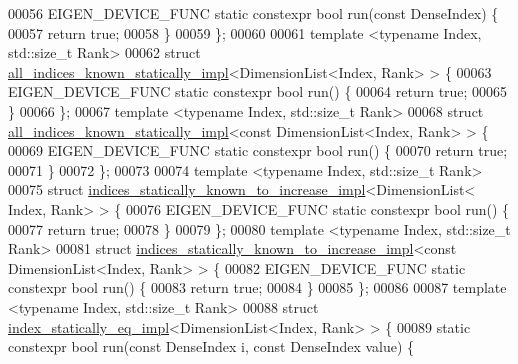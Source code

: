 \begin{DoxyCode}
00056   EIGEN\_DEVICE\_FUNC \textcolor{keyword}{static} constexpr \textcolor{keywordtype}{bool} run(\textcolor{keyword}{const} DenseIndex) \{
00057     \textcolor{keywordflow}{return} \textcolor{keyword}{true};
00058   \}
00059 \};
00060 
00061 \textcolor{keyword}{template} <\textcolor{keyword}{typename} Index, std::\textcolor{keywordtype}{size\_t} Rank>
00062 \textcolor{keyword}{struct }\hyperlink{struct_eigen_1_1internal_1_1all__indices__known__statically__impl}{all\_indices\_known\_statically\_impl}<DimensionList<Index, Rank> > \{
00063   EIGEN\_DEVICE\_FUNC \textcolor{keyword}{static} constexpr \textcolor{keywordtype}{bool} run() \{
00064     \textcolor{keywordflow}{return} \textcolor{keyword}{true};
00065   \}
00066 \};
00067 \textcolor{keyword}{template} <\textcolor{keyword}{typename} Index, std::\textcolor{keywordtype}{size\_t} Rank>
00068 \textcolor{keyword}{struct }\hyperlink{struct_eigen_1_1internal_1_1all__indices__known__statically__impl}{all\_indices\_known\_statically\_impl}<const DimensionList<Index, Rank> 
      > \{
00069   EIGEN\_DEVICE\_FUNC \textcolor{keyword}{static} constexpr \textcolor{keywordtype}{bool} run() \{
00070     \textcolor{keywordflow}{return} \textcolor{keyword}{true};
00071   \}
00072 \};
00073 
00074 \textcolor{keyword}{template} <\textcolor{keyword}{typename} Index, std::\textcolor{keywordtype}{size\_t} Rank>
00075 \textcolor{keyword}{struct }\hyperlink{struct_eigen_1_1internal_1_1indices__statically__known__to__increase__impl}{indices\_statically\_known\_to\_increase\_impl}<DimensionList<
      Index, Rank> > \{
00076   EIGEN\_DEVICE\_FUNC \textcolor{keyword}{static} constexpr \textcolor{keywordtype}{bool} run() \{
00077     \textcolor{keywordflow}{return} \textcolor{keyword}{true};
00078   \}
00079 \};
00080 \textcolor{keyword}{template} <\textcolor{keyword}{typename} Index, std::\textcolor{keywordtype}{size\_t} Rank>
00081 \textcolor{keyword}{struct }\hyperlink{struct_eigen_1_1internal_1_1indices__statically__known__to__increase__impl}{indices\_statically\_known\_to\_increase\_impl}<const 
      DimensionList<Index, Rank> > \{
00082   EIGEN\_DEVICE\_FUNC \textcolor{keyword}{static} constexpr \textcolor{keywordtype}{bool} run() \{
00083     \textcolor{keywordflow}{return} \textcolor{keyword}{true};
00084   \}
00085 \};
00086 
00087 \textcolor{keyword}{template} <\textcolor{keyword}{typename} Index, std::\textcolor{keywordtype}{size\_t} Rank>
00088 \textcolor{keyword}{struct }\hyperlink{struct_eigen_1_1internal_1_1index__statically__eq__impl}{index\_statically\_eq\_impl}<DimensionList<Index, Rank> > \{
00089   \textcolor{keyword}{static} constexpr \textcolor{keywordtype}{bool} run(\textcolor{keyword}{const} DenseIndex i, \textcolor{keyword}{const} DenseIndex value) \{

\end{DoxyCode}
